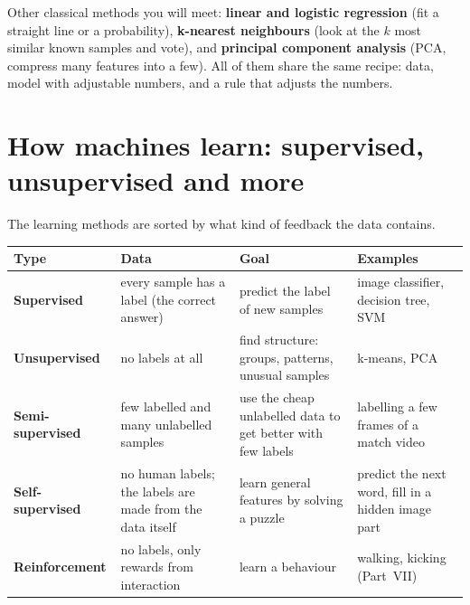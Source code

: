 Other classical methods you will meet: \textbf{linear and logistic regression} (fit a straight line or a probability), \textbf{k-nearest neighbours} (look at the $k$ most similar known samples and vote), and \textbf{principal component analysis} (PCA, compress many features into a few). All of them share the same recipe: data, model with adjustable numbers, and a rule that adjusts the numbers.

\section*{How machines learn: supervised, unsupervised and more}
The learning methods are sorted by what kind of feedback the data contains.

\begin{center}
\renewcommand{\arraystretch}{1.3}
\begin{tabular}{p{2.7cm}p{4.0cm}p{4.2cm}p{2.9cm}}
\textbf{Type} & \textbf{Data} & \textbf{Goal} & \textbf{Examples}\\ \hline
\textbf{Supervised} & every sample has a label (the correct answer) & predict the label of new samples & image classifier, decision tree, SVM\\
\textbf{Unsupervised} & no labels at all & find structure: groups, patterns, unusual samples & k-means, PCA\\
\textbf{Semi-supervised} & few labelled and many unlabelled samples & use the cheap unlabelled data to get better with few labels & labelling a few frames of a match video\\
\textbf{Self-supervised} & no human labels; the labels are made from the data itself & learn general features by solving a puzzle & predict the next word, fill in a hidden image part\\
\textbf{Reinforcement} & no labels, only rewards from interaction & learn a behaviour & walking, kicking (Part~VII)\\
\end{tabular}
\end{center}

